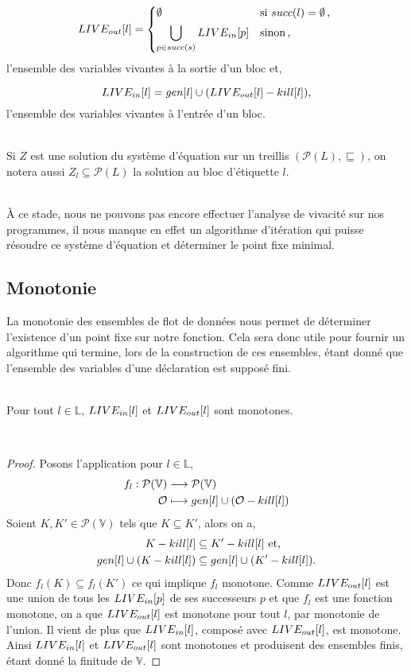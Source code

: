 \documentclass[a4paper, 12pt]{article}
\begin{document}
\[
	LIVE_{out}[l] = 
	\begin{dcases*}
		\emptyset &si $succ(l) = \emptyset $\,, \\
		\bigcup\limits_{p\in succ(s)} LIVE_{in}[p] &sinon\,,
	\end{dcases*}
\]
l'ensemble des variables vivantes à la sortie d'un bloc et,

\[
	LIVE_{in}[l] = gen[l] \cup (LIVE_{out}[l] - kill[l]),
\]
l'ensemble des variables vivantes à l'entrée d'un bloc.
\\
\\
\begin{notation}
	Si $Z$ est une solution du système d'équation sur un treillis $(\mathcal{P}(L), \sqsubseteq)$, on notera aussi $Z_l \subseteq \mathcal{P}(L)$
	la solution au bloc d'étiquette $l$.
\end{notation}
\\
À ce stade, nous ne pouvons pas encore effectuer l'analyse de vivacité sur nos programmes, il nous manque en
effet un algorithme d'itération qui puisse résoudre ce système d'équation et déterminer le point fixe minimal.

\subsection{Monotonie}
La monotonie des ensembles de flot de données nous permet de déterminer l'existence d'un point fixe sur notre
fonction. Cela sera donc utile pour fournir un algorithme qui termine, lors de la construction de ces ensembles, 
étant donné que l'ensemble des variables d'une déclaration est supposé fini.
\\
\\
\begin{lemma}
	Pour tout $l \in \mathbb{L}$, $LIVE_{in}[l]$ et $LIVE_{out}[l]$ sont monotones.
\end{lemma}
\\
\begin{proof}	
Posons l'application pour $l \in \mathbb{L}$,
\begin{align*}
	f_l : \mathcal{P}(\mathbb{V}) &\longrightarrow \mathcal{P}(\mathbb{V}) \\
	\mathcal{O} &\longmapsto gen[l] \cup (\mathcal{O} - kill[l])
\end{align*}
Soient $K, K' \in \mathcal{P}(\mathbb{V})$ tels que $K \subseteq K'$, alors on a,
\begin{align*}
	K - kill[l] &\subseteq K' - kill[l] \text{ et,}\\
	gen[l] \cup (K - kill[l]) &\subseteq gen[l] \cup (K' - kill[l]).
\end{align*}
Donc $f_l(K) \subseteq f_l(K')$ ce qui implique $f_l$ monotone. Comme $LIVE_{out}[l]$ est une union de tous les $LIVE_{in}[p]$
de ses successeurs $p$ et que $f_l$ est une fonction monotone, on a que $LIVE_{out}[l]$ est monotone pour tout $l$, par monotonie 
de l'union. Il vient de plus que $LIVE_{in}[l]$, composé avec $LIVE_{out}[l]$, est monotone.
Ainsi $LIVE_{in}[l]$ et $LIVE_{out}[l]$ sont monotones et produisent des ensembles finis, étant donné
la finitude de $\mathbb{V}$.
\end{proof}
\end{document}

